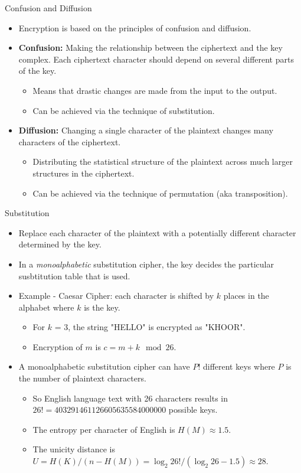 \documentclass[presentation]{beamer}
\begin{document}
\begin{frame}[label=sec-9]{Confusion and Diffusion}
\begin{itemize}[<+->]
\item Encryption is based on the principles of confusion and diffusion.
\item \textbf{Confusion: } Making the relationship between the ciphertext and the key complex. Each ciphertext character should depend on several different parts of the key.
\begin{itemize}
\item Means that drastic changes are made from the input to the output.
\item Can be achieved via the technique of substitution.
\end{itemize}
\item \textbf{Diffusion: } Changing a single character of the plaintext changes many characters of the ciphertext.
\begin{itemize}
\item Distributing the statistical structure of the plaintext across much larger structures in the ciphertext.
\item Can be achieved via the technique of permutation (aka transposition).
\end{itemize}
\end{itemize}
\end{frame}
\begin{frame}[label=sec-10]{Substitution}
\begin{itemize}[<+->]
\item Replace each character of the plaintext with a potentially different character determined by the key.
\item In a \emph{monoalphabetic} substitution cipher, the key decides the particular susbtitution table that is used.
\item Example - Caesar Cipher: each character is shifted by $k$ places in the alphabet where $k$ is the key.
\begin{itemize}
\item For $k$ = 3, the string "HELLO" is encrypted as "KHOOR".
\item Encryption of $m$ is $c = m + k \mod{26}$.
\end{itemize}
\item A monoalphabetic substitution cipher can have $P!$ different keys where $P$ is the number of plaintext characters.
\begin{itemize}
\item So English language text with 26 characters results in $26! = 403291461126605635584000000$ possible keys.
\item The entropy per character of English is $H(M) \approx 1.5$.
\item The unicity distance is $U = H(K) / (n - H(M)) = \log_2{26!} / (\log_2{26} - 1.5) \approx 28$.
\end{itemize}
\end{itemize}
\end{frame}
\end{document}

